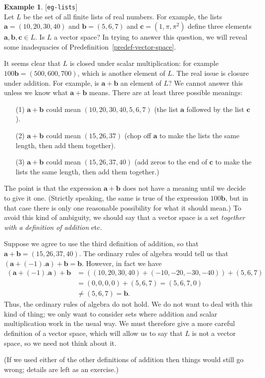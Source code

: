 \documentclass{amsart}
\newcommand{\lbl}[1]{\label{#1}\textup{[\texttt{#1}]}\ \\}
\newcommand{\lbl}{\label}
\newcommand{\va}        {\mathbf{a}}
\newcommand{\vb}        {\mathbf{b}}
\newcommand{\vc}        {\mathbf{c}}
\renewcommand{\:}       {\colon}
\theoremstyle{definition}
\newtheorem{example}[theorem]{Example}
\begin{document}
\begin{example}\lbl{eg-lists}
 Let $L$ be the set of all finite lists of real numbers.
 For example, the lists $\va=(10,20,30,40)$ and
 $\vb=(5,6,7)$ and $\vc=(1,\pi,\pi^2)$ define three elements
 $\va,\vb,\vc\in L$.  Is $L$ a vector space?  In trying to
 answer this question, we will reveal some inadequacies of
 Predefinition~\ref{predef-vector-space}. 

 It seems clear that $L$ is closed under scalar
 multiplication: for example $100\vb=(500,600,700)$, which
 is another element of $L$.  The real issue is closure under
 addition.  For example, is $\va+\vb$ an element of $L$?  We
 cannot answer this unless we know what $\va+\vb$ means.
 There are at least three possible meanings:
 \begin{itemize}
  \item[(1)] $\va+\vb$ could mean $(10,20,30,40,5,6,7)$ 
   (the list $\va$ followed by the list $\vc$).
  \item[(2)] $\va+\vb$ could mean $(15,26,37)$
   (chop off $\va$ to make the lists the same length, then
   add them together).
  \item[(3)] $\va+\vb$ could mean $(15,26,37,40)$ 
   (add zeros to the end of $\vc$ to make the lists the same
   length, then add them together.)
 \end{itemize}
 The point is that the expression $\va+\vb$ does not have a
 meaning until we decide to give it one.  (Strictly
 speaking, the same is true of the expression $100\vb$, but
 in that case there is only one reasonable possibility for
 what it should mean.)  To avoid this kind of ambiguity, we
 should say that a vector space is a set \emph{together with
  a definition of addition} etc.

 Suppose we agree to use the third definition of addition,
 so that $\va+\vb=(15,26,37,40)$.  The ordinary rules of
 algebra would tell us that $(\va + (-1).\va) + \vb=\vb$.
 However, in fact we have
 \begin{align*}
  (\va + (-1).\va) + \vb &=
   ((10,20,30,40) + (-10,-20,-30,-40)) + (5,6,7) \\
  &= (0,0,0,0) + (5,6,7) = (5,6,7,0) \\
  &\neq (5,6,7) = \vb.
 \end{align*}
 Thus, the ordinary rules of algebra do not hold.  We do not
 want to deal with this kind of thing; we only want to
 consider sets where addition and scalar multiplication work
 in the usual way.  We must therefore give a more careful
 definition of a vector space, which will allow us to say
 that $L$ is not a vector space, so we need not think about
 it. 

 (If we used either of the other definitions of addition
 then things would still go wrong; details are left as an
 exercise.) 
\end{example}
\end{document}
